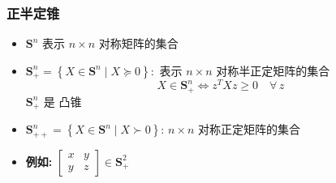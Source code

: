 \documentclass[handout]{beamer}
\begin{document}
\begin{frame}
	\frametitle{正半定锥}
	\begin{itemize}[<+->]
		\item $\mathbf{S}^{n}$ 表示 $n \times n$ 对称矩阵的集合
		\item $\mathbf{S}_{+}^{n}=\left\{X \in \mathbf{S}^{n} \mid X \succeq 0\right\}:$ 表示 $n \times n$ 对称半正定矩阵的集合
		    \begin{equation}
			X \in \mathbf{S}_{+}^{n} \Longleftrightarrow z^{T} X z \geq 0  \quad { \forall }\, z
		    \end{equation}
	        $\mathbf{S}_{+}^{n}$ 是 凸锥
	    \item $\mathbf{S}_{++}^{n}=\left\{X \in \mathbf{S}^{n} \mid X \succ 0\right\}$: $n \times n$ 对称正定矩阵的集合

	
\item[]
	\textbf{例如:} $\left[\begin{array}{ll}x & y \\ y & z\end{array}\right] \in \mathbf{S}_{+}^{2}$	
	
	
\end{itemize}
\end{frame}
\end{document}
